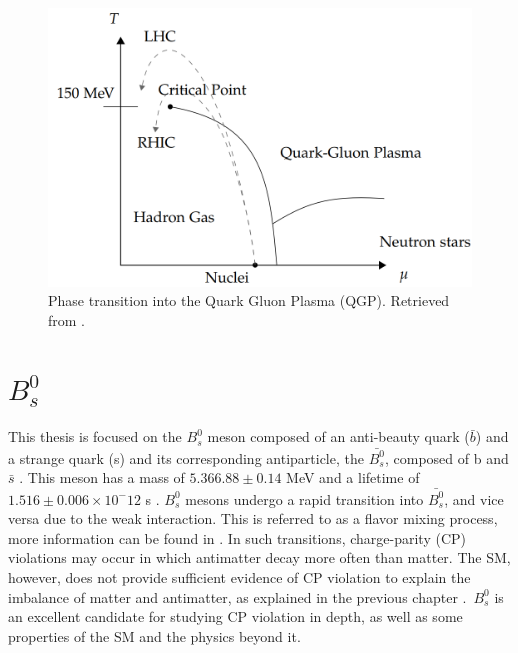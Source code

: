 \begin{figure}[htp!]
	\centering
	\includegraphics[scale=0.34]{MainContent/Figs/QGP.png}
	\caption{Phase transition into the Quark Gluon Plasma (QGP). Retrieved from \cite{parkkila2021quantifying}.}
	\label{fig:qgp}
\end{figure}
\section{$B^0_s$}
\label{sec:b0s}
This thesis is focused on the $B^0_s$ meson composed of an anti-beauty quark ($\bar{b}$) and a strange quark (s) and its corresponding antiparticle, the $\bar{B^0_s}$, composed of b and $\bar{s}$ \cite{mejia2012medida}. This meson has a mass of $5.366.88 \pm 0.14$ MeV and a lifetime of $1.516\pm 0.006 \times 10^-{12}$ s \cite{pdgstrange}. $B^0_s$ mesons undergo a rapid transition into $\bar{B^0_s}$, and vice versa due to the weak interaction. This is referred to as a flavor mixing process, more information can be found in \cite{mejia2012medida, greevenanalysis}. In such transitions, charge-parity (CP) violations may occur in which antimatter decay more often than matter. The SM, however, does not provide sufficient evidence of CP violation to explain the imbalance of matter and antimatter, as explained in the previous chapter \cite{greevenanalysis, cern2020lhcb}. $B^0_s$ is an excellent candidate for studying CP violation in depth, as well as some properties of the SM and the physics beyond it.

